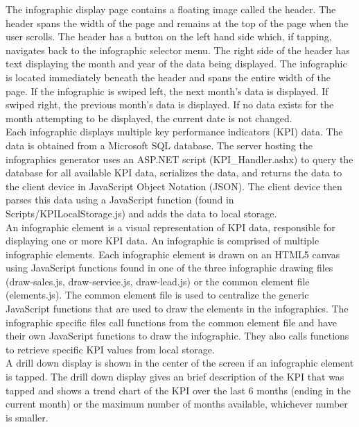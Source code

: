 \documentclass[11pt,a4paper,oneside]{article}
\begin{document}
The infographic display page contains a floating image called the header. The header spans the width of the page and remains at the top of the page when the user scrolls. The header has a button on the left hand side which, if tapping, navigates back to the infographic selector menu. The right side of the header has text displaying the month and year of the data being displayed. The infographic is located immediately beneath the header and spans the entire width of the page. If the infographic is swiped left, the next month's data is displayed. If swiped right, the previous month's data is displayed. If no data exists for the month attempting to be displayed, the current date is not changed.\\


Each infographic displays multiple key performance indicators (KPI) data. The data is obtained from a Microsoft SQL database. The server hosting the infographics generator uses an ASP.NET script (KPI\_Handler.ashx) to query the database for all available KPI data, serializes the data, and returns the data to the client device in JavaScript Object Notation (JSON). The client device then parses this data using a JavaScript function (found in Scripts/KPILocalStorage.js) and adds the data to local storage.\\


An infographic element is a visual representation of KPI data, responsible for displaying one or more KPI data. An infographic is comprised of multiple infographic elements. Each infographic element is drawn on an HTML5 canvas using JavaScript functions found in one of the three infographic drawing files (draw-sales.js, draw-service.js, draw-lead.js) or the common element file (elements.js). The common element file is used to centralize the generic JavaScript functions that are used to draw the elements in the infographics. The infographic specific files call functions from the common element file and have their own JavaScript functions to draw the infographic. They also calls functions to retrieve specific KPI values from local storage.\\


A drill down display is shown in the center of the screen if an infographic element is tapped. The drill down display gives an brief description of the KPI that was tapped and shows a trend chart of the KPI over the last 6 months (ending in the current month) or the maximum number of months available, whichever number is smaller.\\
\end{document}
